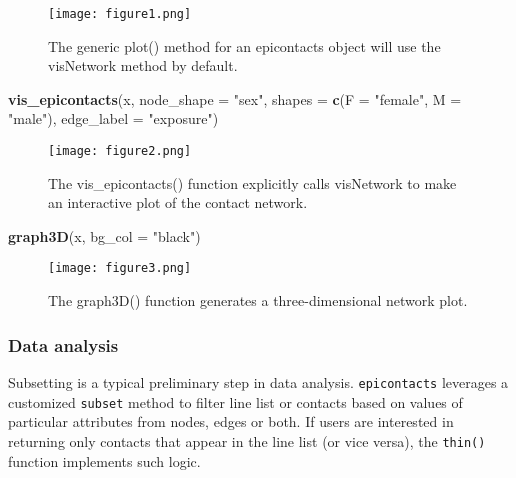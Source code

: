 \documentclass[9pt,a4paper,]{extarticle}
\newenvironment{Shaded}{\begin{snugshade}}{\end{snugshade}}
\newcommand{\KeywordTok}[1]{\textcolor[rgb]{0.13,0.29,0.53}{\textbf{#1}}}
\newcommand{\DataTypeTok}[1]{\textcolor[rgb]{0.13,0.29,0.53}{#1}}
\newcommand{\StringTok}[1]{\textcolor[rgb]{0.31,0.60,0.02}{#1}}
\newcommand{\NormalTok}[1]{#1}
\theoremstyle{definition}
\theoremstyle{definition}
\theoremstyle{definition}
\theoremstyle{remark}
\begin{document}
\begin{figure}
\centering
\texttt{[image: figure1.png]}
\caption{The generic plot() method for an epicontacts object will use the visNetwork method by default.}
\end{figure}

\begin{Shaded}
\begin{Highlighting}[]
\KeywordTok{vis_epicontacts}\NormalTok{(x,}
                \DataTypeTok{node_shape =} \StringTok{"sex"}\NormalTok{,}
                \DataTypeTok{shapes =} \KeywordTok{c}\NormalTok{(}\DataTypeTok{F =} \StringTok{"female"}\NormalTok{, }\DataTypeTok{M =} \StringTok{"male"}\NormalTok{),}
                \DataTypeTok{edge_label =} \StringTok{"exposure"}\NormalTok{)}
\end{Highlighting}
\end{Shaded}

\begin{figure}
\centering
\texttt{[image: figure2.png]}
\caption{The vis\_epicontacts() function explicitly calls visNetwork to make an interactive plot of the contact network.}
\end{figure}

\begin{Shaded}
\begin{Highlighting}[]
\KeywordTok{graph3D}\NormalTok{(x, }\DataTypeTok{bg_col =} \StringTok{"black"}\NormalTok{)}
\end{Highlighting}
\end{Shaded}

\begin{figure}
\centering
\texttt{[image: figure3.png]}
\caption{The graph3D() function generates a three-dimensional network plot.}
\end{figure}

\subsubsection{Data analysis}\label{data-analysis}

Subsetting is a typical preliminary step in data analysis. \texttt{epicontacts} leverages a customized \texttt{subset} method to filter line list or contacts based on values of particular attributes from nodes, edges or both. If users are interested in returning only contacts that appear in the line list (or vice versa), the \texttt{thin()} function implements such logic.
\end{document}

